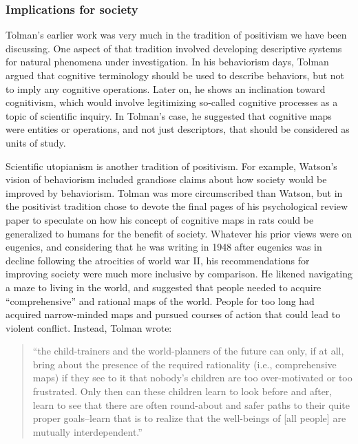 \documentclass[
  oneside,
  12pt]{crumpbook}
\begin{document}
\hypertarget{implications-for-society}{%
\subsubsection{Implications for society}\label{implications-for-society}}

Tolman's earlier work was very much in the tradition of positivism we have been discussing. One aspect of that tradition involved developing descriptive systems for natural phenomena under investigation. In his behaviorism days, Tolman argued that cognitive terminology should be used to describe behaviors, but not to imply any cognitive operations. Later on, he shows an inclination toward cognitivism, which would involve legitimizing so-called cognitive processes as a topic of scientific inquiry. In Tolman's case, he suggested that cognitive maps were entities or operations, and not just descriptors, that should be considered as units of study.

Scientific utopianism is another tradition of positivism. For example, Watson's vision of behaviorism included grandiose claims about how society would be improved by behaviorism. Tolman was more circumscribed than Watson, but in the positivist tradition chose to devote the final pages of his psychological review paper to speculate on how his concept of cognitive maps in rats could be generalized to humans for the benefit of society. Whatever his prior views were on eugenics, and considering that he was writing in 1948 after eugenics was in decline following the atrocities of world war II, his recommendations for improving society were much more inclusive by comparison. He likened navigating a maze to living in the world, and suggested that people needed to acquire ``comprehensive'' and rational maps of the world. People for too long had acquired narrow-minded maps and pursued courses of action that could lead to violent conflict. Instead, Tolman wrote:

\begin{quote}
``the child-trainers and the world-planners of the future can only, if at all, bring about the presence of the required rationality (i.e., comprehensive maps) if they see to it that nobody's children are too over-motivated or too frustrated. Only then can these children learn to look before and after, learn to see that there are often round-about and safer paths to their quite proper goals--learn that is to realize that the well-beings of {[}all people{]} are mutually interdependent.''
\end{quote}
\end{document}

